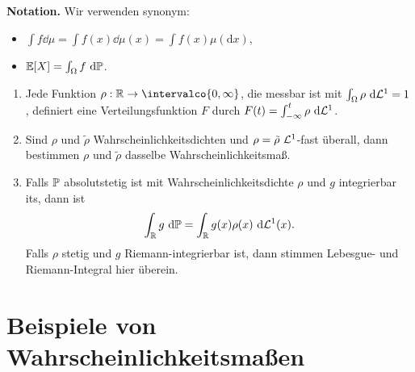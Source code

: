 \documentclass[language=ngerman]{../../Template/TemplateLecture}
\begin{document}
\textbf{Notation.} Wir verwenden synonym: 
\begin{itemize}
    \item $\int f\dd\mu = \int f(x) \dd\mu(x) = \int f(x) \mu(\mathrm{d}x)$,
    \item $\mathbb{E}[X] = \int_\Omega f~\mathrm{d}\mathbb{P}$.
\end{itemize}

\begin{bemerkung}
    \begin{enumerate}[$(i)$]
        \item Jede Funktion $\rho: \IR \to \intervalco{0,\infty}$, die messbar ist mit $\int_\Omega \rho ~\mathrm{d}\mathcal{L}^1 = 1$, definiert eine Verteilungsfunktion $F$ durch $F(t) = \int_{-\infty}^t \rho ~\mathrm{d}\mathcal{L}^1$. 
        \item Sind $\rho$ und $\tilde{\rho}$ Wahrscheinlichkeitsdichten und $\rho = \tilde{\rho}~\mathcal{L}^1$-fast überall, dann bestimmen $\rho$ und $\tilde{\rho}$ dasselbe Wahrscheinlichkeitsmaß.
        \item Falls $\mathbb{P}$ absolutstetig ist mit Wahrscheinlichkeitsdichte $\rho$ und $g$ integrierbar its, dann ist 
        \begin{equation}
            \int_{\mathbb{R}} g ~\mathrm{d}\mathbb{P} = \int_{\mathbb{R}} g(x) \rho(x) ~\mathrm{d}\mathcal{L}^1(x).
        \end{equation}
        Falls $\rho$ stetig und $g$ Riemann-integrierbar ist, dann stimmen Lebesgue- und Riemann-Integral hier überein.
    \end{enumerate}
\end{bemerkung}

\section{Beispiele von Wahrscheinlichkeitsmaßen}
\end{document}

